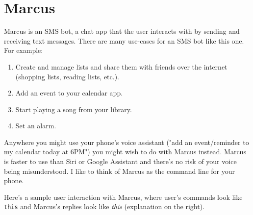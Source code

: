 \documentclass{article}
\newcommand{\user}[1]{\texttt{#1}}
\newcommand{\marcus}[1]{\textit{#1}}
\begin{document}
\section{Marcus}

Marcus is an SMS bot, a chat app that the user interacts with by sending and receiving text messages.
There are many use-cases for an SMS bot like this one.
For example:

\begin{enumerate}
  \item Create and manage lists and share them with friends over the internet (shopping lists, reading lists, etc.).
  \item Add an event to your calendar app.
  \item Start playing a song from your library.
  \item Set an alarm.
\end{enumerate}

Anywhere you might use your phone's voice assistant ("add an event/reminder to my calendar today at 6PM") you might wish to do with Marcus instead.
Marcus is faster to use than Siri or Google Assistant and there's no risk of your voice being misunderstood.
I like to think of Marcus as the command line for your phone.

Here's a sample user interaction with Marcus, where user's commands look like \user{this} and Marcus's replies look like \marcus{this} (explanation on the right).
\end{document}
